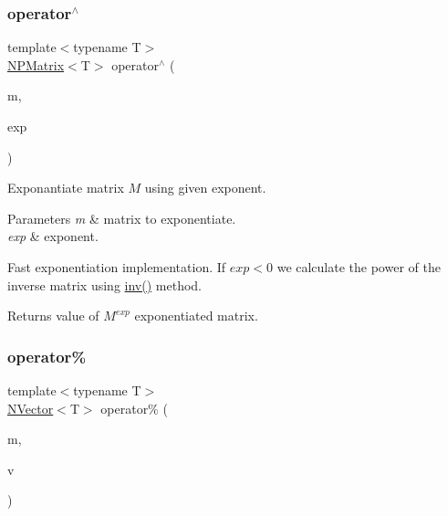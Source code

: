 \subsubsection{\texorpdfstring{operator$^\wedge$}{operator^}}
{\footnotesize\ttfamily template$<$typename T$>$ \\
\mbox{\hyperlink{class_n_p_matrix}{N\+P\+Matrix}}$<$T$>$ operator$^\wedge$ (\begin{DoxyParamCaption}\item[{\mbox{\hyperlink{class_n_p_matrix}{N\+P\+Matrix}}$<$ T $>$}]{m,  }\item[{long}]{exp }\end{DoxyParamCaption})\hspace{0.3cm}{\ttfamily [friend]}}



Exponantiate matrix $ M $ using given exponent. 


\begin{DoxyParams}{Parameters}
{\em m} & matrix to exponentiate. \\
\hline
{\em exp} & exponent.\\
\hline
\end{DoxyParams}
Fast exponentiation implementation. If $ exp < 0 $ we calculate the power of the inverse matrix using {\ttfamily \mbox{\hyperlink{class_n_p_matrix_ac672c69c4b0ec298ac3e8326fcce48cb}{inv()}}} method. \begin{DoxyReturn}{Returns}
value of $ M^{exp} $ exponentiated matrix. 
\end{DoxyReturn}
\mbox{\label{class_n_p_matrix_a15e021ffe286b766ab68b83a6e70d891}} 
\subsubsection{\texorpdfstring{operator\%}{operator\%}}
{\footnotesize\ttfamily template$<$typename T$>$ \\
\mbox{\hyperlink{class_n_vector}{N\+Vector}}$<$T$>$ operator\% (\begin{DoxyParamCaption}\item[{const \mbox{\hyperlink{class_n_p_matrix}{N\+P\+Matrix}}$<$ T $>$ \&}]{m,  }\item[{\mbox{\hyperlink{class_n_vector}{N\+Vector}}$<$ T $>$}]{v }\end{DoxyParamCaption})\hspace{0.3cm}{\ttfamily [friend]}}



